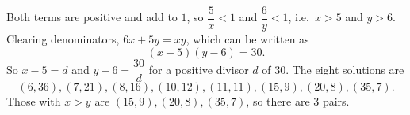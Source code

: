 Both terms are positive and add to $1$, so $\dfrac{5}{x}<1$ and $\dfrac{6}{y}<1$, i.e.\ $x>5$ and $y>6$. Clearing denominators, $6x+5y=xy$, which can be written as
\[
(x-5)(y-6)=30 .
\]
So $x-5=d$ and $y-6=\dfrac{30}{d}$ for a positive divisor $d$ of $30$. The eight solutions are
\[
(6,36),(7,21),(8,16),(10,12),(11,11),(15,9),(20,8),(35,7).
\]
Those with $x>y$ are $(15,9),(20,8),(35,7)$, so there are $\boxed{3}$ pairs.
